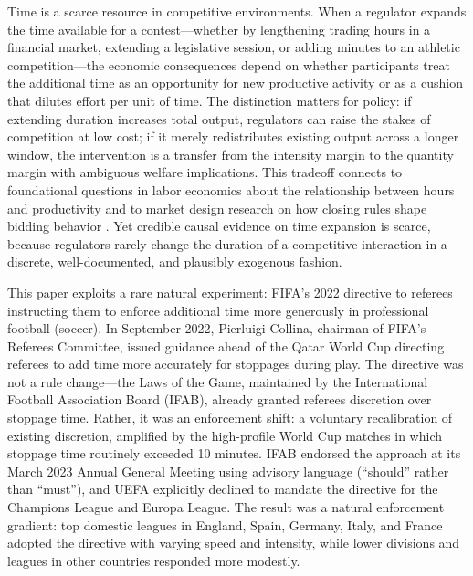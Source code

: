 \documentclass[12pt]{article}
\begin{document}
Time is a scarce resource in competitive environments. When a regulator expands the time available for a contest---whether by lengthening trading hours in a financial market, extending a legislative session, or adding minutes to an athletic competition---the economic consequences depend on whether participants treat the additional time as an opportunity for new productive activity or as a cushion that dilutes effort per unit of time. The distinction matters for policy: if extending duration increases total output, regulators can raise the stakes of competition at low cost; if it merely redistributes existing output across a longer window, the intervention is a transfer from the intensity margin to the quantity margin with ambiguous welfare implications. This tradeoff connects to foundational questions in labor economics about the relationship between hours and productivity \citep{pencavel2015effects} and to market design research on how closing rules shape bidding behavior \citep{rothockenfels2002}. Yet credible causal evidence on time expansion is scarce, because regulators rarely change the duration of a competitive interaction in a discrete, well-documented, and plausibly exogenous fashion.

This paper exploits a rare natural experiment: FIFA's 2022 directive to referees instructing them to enforce additional time more generously in professional football (soccer). In September 2022, Pierluigi Collina, chairman of FIFA's Referees Committee, issued guidance ahead of the Qatar World Cup directing referees to add time more accurately for stoppages during play. The directive was not a rule change---the Laws of the Game, maintained by the International Football Association Board (IFAB), already granted referees discretion over stoppage time. Rather, it was an enforcement shift: a voluntary recalibration of existing discretion, amplified by the high-profile World Cup matches in which stoppage time routinely exceeded 10 minutes. IFAB endorsed the approach at its March 2023 Annual General Meeting using advisory language (``should'' rather than ``must''), and UEFA explicitly declined to mandate the directive for the Champions League and Europa League. The result was a natural enforcement gradient: top domestic leagues in England, Spain, Germany, Italy, and France adopted the directive with varying speed and intensity, while lower divisions and leagues in other countries responded more modestly.
\end{document}
